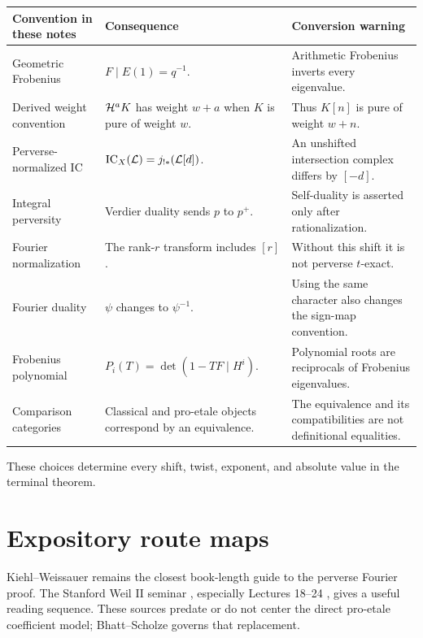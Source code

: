 \begin{longtable}{
 >{\raggedright\arraybackslash}p{}
 >{\raggedright\arraybackslash}p{}
 >{\raggedright\arraybackslash}p{}}
\toprule
Convention in these notes & Consequence & Conversion warning\\
\midrule
\endhead
Geometric Frobenius &
\(F\mid E(1)=q^{-1}\). &
Arithmetic Frobenius inverts every eigenvalue.\\

Derived weight convention &
\(\mathcal H^aK\) has weight \(w+a\) when \(K\) is pure of weight \(w\). &
Thus \(K[n]\) is pure of weight \(w+n\).\\

Perverse-normalized IC &
\(\operatorname{IC}_X(\mathcal L)=j_{!*}(\mathcal L[d])\). &
An unshifted intersection complex differs by \([-d]\).\\

Integral perversity &
Verdier duality sends \(p\) to \(p^+\). &
Self-duality is asserted only after rationalization.\\

Fourier normalization &
The rank-\(r\) transform includes \([r]\). &
Without this shift it is not perverse \(t\)-exact.\\

Fourier duality &
\(\psi\) changes to \(\psi^{-1}\). &
Using the same character also changes the sign-map convention.\\

Frobenius polynomial &
\(P_i(T)=\det(1-TF\mid H^i)\). &
Polynomial roots are reciprocals of Frobenius eigenvalues.\\

Comparison categories &
Classical and pro-etale objects correspond by an equivalence. &
The equivalence and its compatibilities are not definitional equalities.\\
\bottomrule
\end{longtable}

These choices determine every shift, twist, exponent, and absolute value in
the terminal theorem.

\section{Expository route maps}

Kiehl--Weissauer \cite{KiehlWeissauer} remains the closest book-length guide
to the perverse Fourier proof.  The Stanford Weil II seminar
\cite{StanfordWeilIISeminar}, especially Lectures 18--24
\cite{StanfordL18,StanfordL19,StanfordL22,StanfordL23,StanfordL24}, gives a
useful reading sequence.  These sources predate or do not center the direct
pro-etale coefficient model; Bhatt--Scholze governs that replacement.

